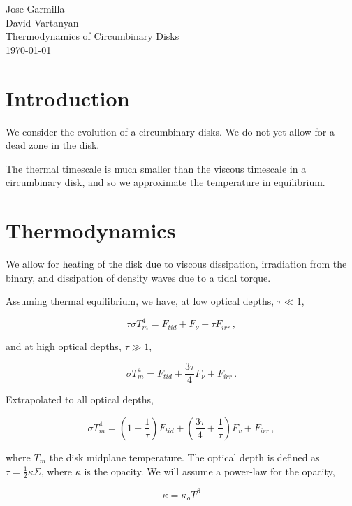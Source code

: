 \documentclass{article}
\begin{document}
\begin{flushleft}
Jose Garmilla \\
David Vartanyan\\
Thermodynamics of Circumbinary Disks\\
\today\\
\end{flushleft}

\section{Introduction}
We consider the evolution of a circumbinary disks. We do not yet allow for a dead zone in the disk.

The thermal timescale is much smaller than the viscous timescale in a circumbinary disk, and so we approximate the temperature in equilibrium.

\section{Thermodynamics}
We allow for heating of the disk due to viscous dissipation, irradiation from the binary, and dissipation of density waves due to a tidal torque.

Assuming thermal equilibrium, we have, at low optical depths, $\tau \ll 1$,

\begin{equation}
\tau \sigma T_m^4 = F_{tid} + F_{\nu} + \tau F_{irr}\,,
\end{equation}

and at high optical depths, $\tau \gg 1$,

\begin{equation}
\sigma T_m^4 = F_{tid} + \frac{3\tau}{4}  F_\nu + F_{irr}\,.
\end{equation}

Extrapolated to all optical depths,

\begin{equation} \label{eq:encon}
\sigma T_m^4 = \left(1+\frac{1}{\tau}\right) F_{tid} + \left(\frac{3\tau}{4} + \frac{1}{\tau}\right) F_{v} + F_{irr}\,,
\end{equation}

where $T_m$ the disk midplane temperature. The optical depth is defined as $\tau =\frac{1}{2} \kappa \Sigma$, where $\kappa$ is the opacity. We will assume a power-law for the opacity,

\begin{equation}
\kappa = \kappa_o T^\beta
\end{equation} 
\end{document}

